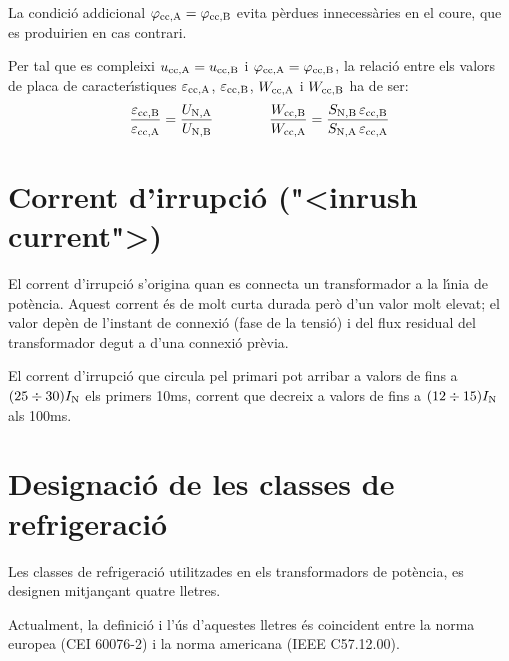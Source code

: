 La condici\'{o} addicional $\varphi_\mathrm{cc,A} =\varphi_\mathrm{cc,B}$ evita p\`{e}rdues innecess\`{a}ries en el coure, que es produirien en cas contrari.

Per tal que es compleixi $u_\mathrm{cc,A} = u_\mathrm{cc,B} $ i $\varphi_\mathrm{cc,A} =\varphi_\mathrm{cc,B}$, la relaci\'{o} entre els valors de placa de caracter\'{\i}stiques $\varepsilon_\mathrm{cc,A}$, $\varepsilon_\mathrm{cc,B}$, $W_\mathrm{cc,A}$ i $W_\mathrm{cc,B}$ ha de ser:
\begin{equation}
    \frac{\varepsilon_\mathrm{cc,B}}{\varepsilon_\mathrm{cc,A}} = \frac{U_\mathrm{N,A}}{U_\mathrm{N,B}} \qquad\qquad
    \frac{W_\mathrm{cc,B}}{W_\mathrm{cc,A}} = \frac{S_\mathrm{N,B} \,\varepsilon_\mathrm{cc,B}}{S_\mathrm{N,A}\, \varepsilon_\mathrm{cc,A}}
\end{equation}

\section{Corrent d'irrupci\'{o} ({"<}inrush current{">})}

El corrent d'irrupci\'{o} s'origina quan es  connecta un transformador a la l\'{\i}nia de pot\`{e}ncia. Aquest corrent \'{e}s de molt curta durada per\`{o} d'un valor molt elevat; el valor dep\`{e}n de l'instant de connexi\'{o} (fase de la tensi\'{o}) i del flux residual del transformador degut a d'una connexi\'{o} pr\`{e}via.

El corrent d'irrupci\'{o} que circula pel primari pot arribar a valors de fins a $(25\div 30) I_\mathrm{N}$ els primers 10\unit{ms}, corrent que decreix a valors de fins  a $(12\div 15) I_\mathrm{N}$ als 100\unit{ms}.

\section{Designaci\'{o} de les classes de refrigeraci\'{o}}\label{sec:trafos-pot-refrig}
 

Les classes de refrigeraci\'{o} utilitzades en els transformadors de
pot\`{e}ncia, es designen mitjan\c{c}ant quatre lletres.

Actualment, la definici\'{o} i l'\'{u}s d'aquestes lletres \'{e}s coincident
entre la norma europea (\textsf{CEI 60076-2}) i la norma americana
(\textsf{IEEE C57.12.00}).

